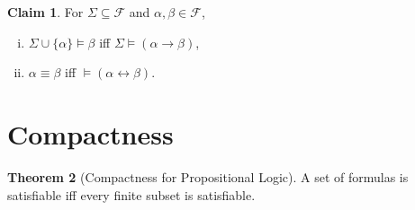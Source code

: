\documentclass[12pt]{article}
\theoremstyle{definition}
\newtheorem{theorem}{Theorem}[section]
\newtheorem{claim}[theorem]{Claim}
\newcommand{\<}{\langle}
\renewcommand{\>}{\rangle}
\newcommand{\seq}{\subseteq}
\newcommand{\FF}{\mathcal{F}}
\newcommand{\liff}{\leftrightarrow}
\begin{document}
\begin{claim}
    For $\Sigma \seq \FF$ and $\alpha, \beta \in \FF$,
    \begin{enumerate}[(i)]
        \item $\Sigma \cup \{\alpha\} \vDash \beta$ iff $\Sigma \vDash (\alpha \to \beta)$,
        \item $\alpha \equiv \beta$ iff $\vDash (\alpha \liff \beta)$.
    \end{enumerate}
\end{claim}

\section{Compactness}

\begin{theorem}[Compactness for Propositional Logic]
    A set of formulas is satisfiable iff every finite subset is satisfiable.
\end{theorem}
\end{document}
